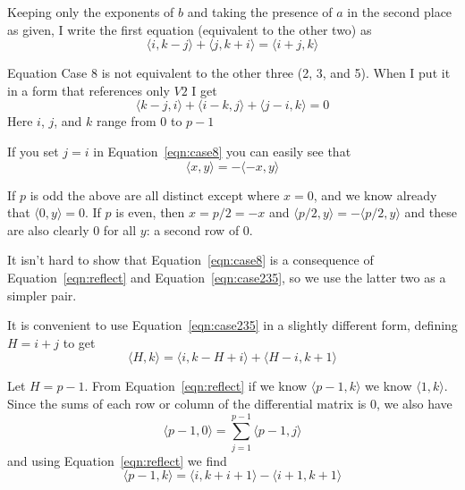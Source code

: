 \documentclass{revtex4-1}
\begin{document}
Keeping only the exponents of $b$ and taking the presence of $a$ in the second
place as given, I write the first equation (equivalent to the other two) as
\begin{equation} \label{eqn:case235}
\langle i, k-j\rangle + \langle j, k+i\rangle = \langle i+j, k\rangle
\end{equation}

Equation Case 8 is not equivalent to the other three (2, 3, and 5).  
When I put it in a form that references
only $V2$ I get
\begin{equation} \label{eqn:case8}
 \langle k-j, i\rangle +\langle i-k, j\rangle + \langle j-i, k\rangle = 0
\end{equation}
Here $i$, $j$, and $k$ range from $0$ to $p-1$

\par If you set $j=i$ in Equation~\ref{eqn:case8} you can easily see that
\begin{equation} \label{eqn:reflect}
\langle x, y \rangle = - \langle -x, y \rangle
\end{equation}

\par If $p$ is odd the above are all distinct except where $x=0$, and we know already that 
$\langle 0, y \rangle=0$.  If $p$ is even, then $x=p/2=-x$ and $\langle p/2, y \rangle =
-\langle p/2, y \rangle$ and these are also clearly $0$ for all $y$:  a second row of $0$.

\par It isn't hard to show that Equation~\ref{eqn:case8} is a consequence of
Equation~\ref{eqn:reflect} and Equation~\ref{eqn:case235}, so we use the latter 
two as a simpler pair.

\par It is convenient to use Equation~\ref{eqn:case235} in a slightly different form, defining
$H = i + j$ to get
\begin{equation} \label{eqn:hk}
\langle H, k \rangle = \langle i, k - H + i \rangle + \langle H - i, k + 1 \rangle
\end{equation}

\par Let $H = p-1$.  From Equation~\ref{eqn:reflect} if we know $\langle p-1, k \rangle$
we know $\langle 1, k \rangle$.  Since the sums of each row or column of the differential matrix
is $0$, we also have
\begin{equation}
\langle p-1, 0 \rangle = \sum_{j=1}^{p-1} \langle p-1, j \rangle 
\end{equation}
and using Equation~\ref{eqn:reflect} we find
\begin{equation}
\langle p-1, k \rangle = \langle i, k+i+1 \rangle - \langle i+1, k+1 \rangle
\end{equation}
\end{document}
